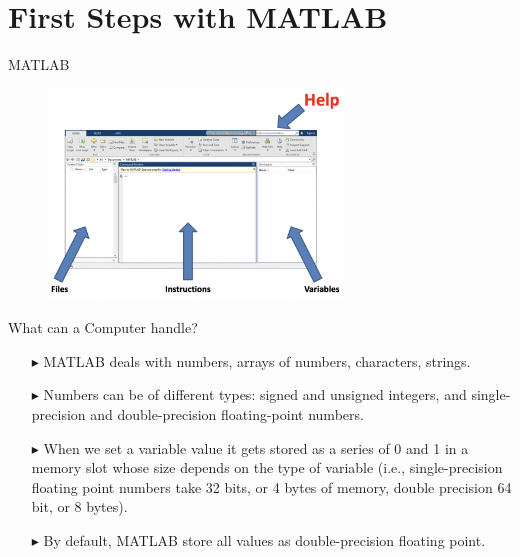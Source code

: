 \documentclass[xcolor={dvipsnames,rgb}, aspectratio=169]{beamer}
\begin{document}
\section{First Steps with MATLAB}
\begin{frame}{MATLAB}
\begin{figure}
   \centering
   \includegraphics[width=0.7\textwidth]{Figures/MATLAB-2.png}
\end{figure}
\end{frame}

\begin{frame}{What can a Computer handle?}
\begin{itemize}
   \item[$\blacktriangleright$] MATLAB deals with numbers, arrays of numbers, characters,
      strings.
   \item[$\blacktriangleright$] Numbers can be of different types: signed and unsigned
      integers, and single-precision and double-precision floating-point numbers.
   \item[$\blacktriangleright$] When we set a variable value it gets stored as a series
      of 0 and 1 in a memory slot whose size depends on the type of variable (i.e.,
      single-precision floating point numbers take 32 bits, or 4 bytes of memory, double
      precision 64 bit, or 8 bytes).
   \item[$\blacktriangleright$] By default, MATLAB store all values as double-precision
      floating point.
\end{itemize}
\end{frame}
\end{document}
